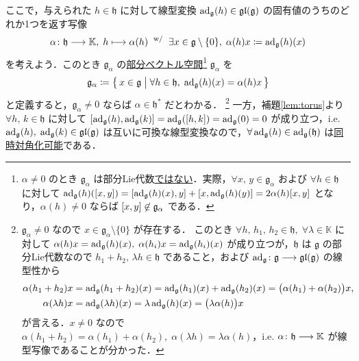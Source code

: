 \documentclass[rep_main]{subfiles}
\begin{document}
ここで，与えられた $h \in \mathfrak{h}$ に対して線型変換 $\operatorname{ad}_{\mathfrak{g}}(h) \in \mathfrak{gl}(\mathfrak{g})$ の固有値のうちのどれか1つを返す写像
\begin{align}
	\alpha \colon \mathfrak{h} \longrightarrow \mathbb{K},\; h \longmapsto \alpha(h) \mathrel{} {}^{\mathrm{w}/} \mathrel{} \exists x \in \mathfrak{g}\setminus \{0\},\; \alpha(h)x \coloneqq \operatorname{ad}_{\mathfrak{g}}(h)(x)
\end{align}
を考えよう．このとき $\mathfrak{g}_\alpha$ の\underline{部分ベクトル空間}\footnote{$\alpha \neq 0$ のとき $\mathfrak{g}_\alpha$ は部分Lie代数\underline{ではない}．実際，$\forall x,\, y \in \mathfrak{g}_\alpha$ および $\forall h \in \mathfrak{h}$ に対して $\ad_{\mathfrak{g}}(h)(\comm{x}{y}) = \comm{\ad_{\mathfrak{g}}(h)(x)}{y} + \comm{x}{\ad_{\mathfrak{g}}(h)(y)} = 2\alpha(h) \comm{x}{y}$ となり，$\alpha(h) \neq 0$ ならば $\comm{x}{y} \not\in \mathfrak{g}_\alpha$ である．} $\mathfrak{g}_\alpha$ を
\begin{align}
	\label{def:ga}
	\mathfrak{g}_\alpha \coloneqq \bigl\{\, x \in \mathfrak{g} \bigm| \forall h \in \mathfrak{h},\; \operatorname{ad}_{\mathfrak{g}}(h)(x) = \alpha(h) x \,\bigr\} 
\end{align}
と定義すると，$\mathfrak{g}_\alpha \neq 0$ ならば $\alpha \in \mathfrak{h}^*$ だとわかる．
\footnote{
	$\mathfrak{g}_\alpha \neq 0$ なので $x \in \mathfrak{g}_\alpha \setminus \{0\}$ が存在する．
	このとき $\forall h,\, h_1,\, h_2 \in \mathfrak{h},\; \forall \lambda \in \mathbb{K}$ に対して $\alpha(h)x = \operatorname{ad}_{\mathfrak{g}}(h)(x),\; \alpha(h_i)x = \operatorname{ad}_{\mathfrak{g}}(h_i)(x)$ が成り立つが，$\mathfrak{h}$ は $\mathfrak{g}$ の部分Lie代数なので $h_1 + h_2,\, \lambda h \in \mathfrak{h}$ であること，および $\operatorname{ad}_{\mathfrak{g}} \colon \mathfrak{g} \longrightarrow \mathfrak{gl}(\mathfrak{g})$ の線型性から
	\begin{align}
		\alpha(h_1 + h_2)x &= \operatorname{ad}_{\mathfrak{g}}(h_1 + h_2)(x) = \operatorname{ad}_{\mathfrak{g}}(h_1)(x) + \operatorname{ad}_{\mathfrak{g}}(h_2)(x) = \bigl(\alpha(h_1) + \alpha(h_2)\bigr)x, \\
		\alpha(\lambda h)x &= \operatorname{ad}_{\mathfrak{g}}(\lambda h)(x) = \lambda \operatorname{ad}_{\mathfrak{g}}(h)(x) = \bigl(\lambda \alpha(h)\bigr)x
	\end{align}
	が言える．$x \neq 0$ なので $\alpha(h_1 + h_2) = \alpha(h_1) + \alpha(h_2),\; \alpha(\lambda h) = \lambda \alpha(h)$，i.e. $\alpha \colon \mathfrak{h} \longrightarrow \mathbb{K}$ が線型写像であることが分かった．
}
一方，補題\ref{lem:torus}より $\forall h,\, k \in \mathfrak{h}$ に対して $\comm{\ad_{\mathfrak{g}}(h)}{\ad_{\mathfrak{g}}(k)} = \ad_{\mathfrak{g}}(\comm{h}{k}) = \ad_{\mathfrak{g}}(0) = 0$ が成り立つ，i.e. $\operatorname{ad}_{\mathfrak{g}}(h),\; \operatorname{ad}_{\mathfrak{g}} (k) \in \mathfrak{gl}(\mathfrak{g})$ は互いに可換な線型変換なので，$\forall \operatorname{ad}_{\mathfrak{g}}(h) \in \operatorname{ad}_{\mathfrak{g}}(\mathfrak{h})$ は\underline{同時対角化可能}である．
\end{document}
